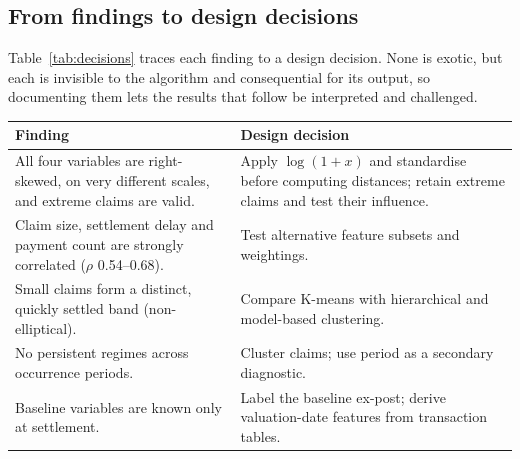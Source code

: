 \subsection{From findings to design decisions}
\label{sec:decisions}

Table~\ref{tab:decisions} traces each finding to a design decision. None is exotic, but each is invisible to the algorithm and consequential for its output, so documenting them lets the results that follow be interpreted and challenged.

\begin{center}
\footnotesize
{}
\label{tab:decisions}
\begin{tabularx}{\textwidth}{@{}>{\raggedright\arraybackslash}X>{\raggedright\arraybackslash}X@{}}
\toprule
Finding & Design decision \\
\midrule
All four variables are right-skewed, on very different scales, and extreme claims are valid. & Apply $\log(1+x)$ and standardise before computing distances; retain extreme claims and test their influence. \\
Claim size, settlement delay and payment count are strongly correlated ($\rho$ 0.54--0.68). & Test alternative feature subsets and weightings. \\
Small claims form a distinct, quickly settled band (non-elliptical). & Compare K-means with hierarchical and model-based clustering. \\
No persistent regimes across occurrence periods. & Cluster claims; use period as a secondary diagnostic. \\
Baseline variables are known only at settlement. & Label the baseline ex-post; derive valuation-date features from transaction tables. \\
\bottomrule
\end{tabularx}
\end{center}
